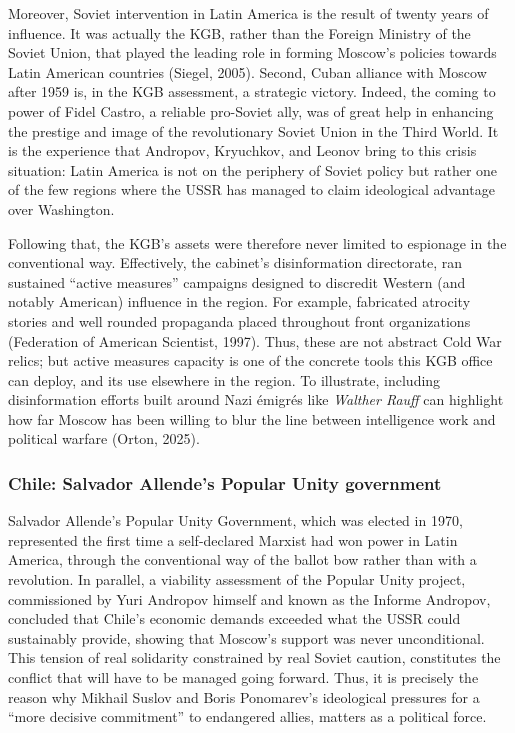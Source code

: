 Moreover, Soviet intervention in Latin America is the result of twenty years of influence. It was actually the KGB, rather than the Foreign Ministry of the Soviet Union, that played the leading role in forming Moscow's policies towards Latin American countries (Siegel, 2005). Second, Cuban alliance with Moscow after 1959 is, in the KGB assessment, a strategic victory. Indeed, the coming to power of Fidel Castro, a reliable pro-Soviet ally, was of great help in enhancing the prestige and image of the revolutionary Soviet Union in the Third World. It is the experience that Andropov, Kryuchkov, and Leonov bring to this crisis situation: Latin America is not on the periphery of Soviet policy but rather one of the few regions where the USSR has managed to claim ideological advantage over Washington.

Following that, the KGB’s assets were therefore never limited to espionage in the conventional way. Effectively, the cabinet’s disinformation directorate, ran sustained “active measures” campaigns designed to discredit Western (and notably American) influence in the region. For example, fabricated atrocity stories and well rounded propaganda placed throughout front organizations (Federation of American Scientist, 1997). Thus, these are not abstract Cold War relics; but active measures capacity is one of the concrete tools this KGB office can deploy, and its use elsewhere in the region. To illustrate, including disinformation efforts built around Nazi émigrés like \emph{Walther Rauff} can highlight how far Moscow has been willing to blur the line between intelligence work and political warfare (Orton, 2025).

\subsubsection{Chile: Salvador Allende’s Popular Unity government}

Salvador Allende’s Popular Unity Government, which was elected in 1970, represented the first time a self-declared Marxist had won power in Latin America, through the conventional way of the ballot bow rather than with a revolution. In parallel, a viability assessment of the Popular Unity project, commissioned by Yuri Andropov himself and known as the Informe Andropov, concluded that Chile's economic demands exceeded what the USSR could sustainably provide, showing that Moscow’s support was never unconditional.  This tension of real solidarity constrained by real Soviet caution, constitutes the conflict that will have to be managed going forward. Thus, it is precisely the reason why Mikhail Suslov and Boris Ponomarev’s ideological pressures for a “more decisive commitment” to endangered allies, matters as a political force.

